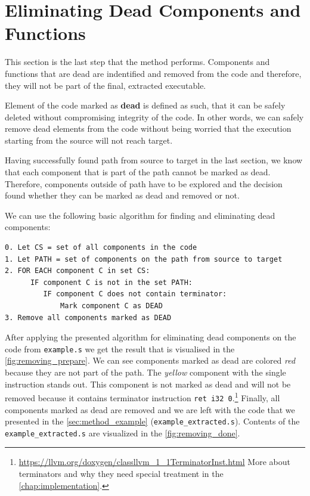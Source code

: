 \documentclass[12pt, twoside]{fithesis2}
\renewcommand{\_}{\leavevmode \kern0.07em\vbox{\hrule width0.4em}}
\begin{document}
\section{Eliminating Dead Components and Functions}
\label{sec:design-removing}


This section is the last step that the method performs.
Components and functions that are dead are indentified and removed from the code
and therefore, they will not be part of the final, extracted executable.

Element of the code marked as \textbf{dead} is defined as such,
that it can be safely deleted without compromising integrity of the code.
In other words, we can safely remove dead elements from the code without being
worried that the execution starting from the source will not reach target.

Having successfully found path from source to target in the last section,
we know that each component that is part of the path cannot be marked as dead.
Therefore, components outside of path have to be explored and the decision
found whether they can be marked as dead and removed or not.

We can use the following basic algorithm for finding and eliminating dead
components:

\begin{verbatim}
0. Let CS = set of all components in the code
1. Let PATH = set of components on the path from source to target
2. FOR EACH component C in set CS:
      IF component C is not in the set PATH:
         IF component C does not contain terminator:
             Mark component C as DEAD
3. Remove all components marked as DEAD
\end{verbatim}


After applying the presented algorithm for eliminating dead components on the
code from \texttt{example.s} we get the result that is visualised
in the \autoref{fig:removing_prepare}.
We can see components marked as dead are colored \emph{red} because they are not
part of the path.
The \emph{yellow} component with the single instruction stands out.
This component is not marked as dead and will not be removed because it contains
terminator instruction \texttt{ret i32 0}.\footnote{
\url{https://llvm.org/doxygen/classllvm_1_1TerminatorInst.html}
More about terminators and why they need special treatment in the
\autoref{chap:implementation}.
}
Finally, all components marked as dead are removed and we are left with the
code that we presented in the \autoref{sec:method_example}
(\texttt{example_extracted.s}).
Contents of the \texttt{example_extracted.s} are visualized in the
\autoref{fig:removing_done}.
\end{document}
